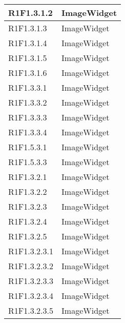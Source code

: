 \begin{center}
\begin{longtable}{|p{3cm}|p{10cm}|}
		R1F1.3.1.2 & ImageWidget\newline \\ \hline
		R1F1.3.1.3 & ImageWidget\newline \\ \hline
		R1F1.3.1.4 & ImageWidget\newline \\ \hline
		R1F1.3.1.5 & ImageWidget\newline \\ \hline
		R1F1.3.1.6 & ImageWidget\newline \\ \hline
		R1F1.3.3.1 & ImageWidget\newline \\ \hline
		R1F1.3.3.2 & ImageWidget\newline \\ \hline
		R1F1.3.3.3 & ImageWidget\newline \\ \hline
		R1F1.3.3.4 & ImageWidget\newline \\ \hline
		R1F1.5.3.1 & ImageWidget\newline \\ \hline
		R1F1.5.3.3 & ImageWidget\newline \\ \hline
		R1F1.3.2.1 & ImageWidget\newline \\ \hline
		R1F1.3.2.2 & ImageWidget\newline \\ \hline
		R1F1.3.2.3 & ImageWidget\newline \\ \hline
		R1F1.3.2.4 & ImageWidget\newline \\ \hline
		R1F1.3.2.5 & ImageWidget\newline \\ \hline
		R1F1.3.2.3.1 & ImageWidget\newline \\ \hline
		R1F1.3.2.3.2 & ImageWidget\newline \\ \hline
		R1F1.3.2.3.3 & ImageWidget\newline \\ \hline
		R1F1.3.2.3.4 & ImageWidget\newline \\ \hline
		R1F1.3.2.3.5 & ImageWidget\newline \\ \hline

\end{longtable}
\end{center}
